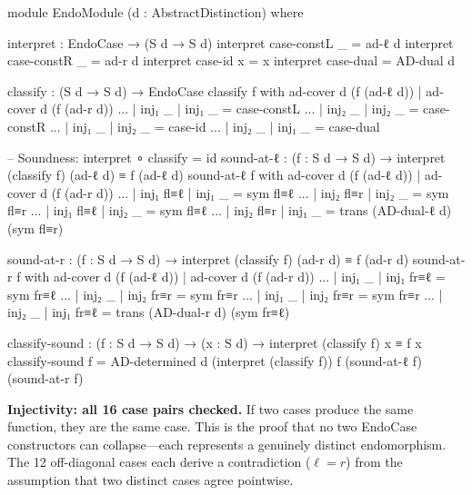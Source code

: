 \documentclass[11pt,a4paper]{article}
\begin{document}
\begin{code}
module EndoModule (d : AbstractDistinction) where

  interpret : EndoCase → (S d → S d)
  interpret case-constL _ = ad-ℓ d
  interpret case-constR _ = ad-r d
  interpret case-id     x = x
  interpret case-dual     = AD-dual d

  classify : (S d → S d) → EndoCase
  classify f with ad-cover d (f (ad-ℓ d)) | ad-cover d (f (ad-r d))
  ... | inj₁ _ | inj₁ _ = case-constL
  ... | inj₂ _ | inj₂ _ = case-constR
  ... | inj₁ _ | inj₂ _ = case-id
  ... | inj₂ _ | inj₁ _ = case-dual

  -- Soundness: interpret ∘ classify = id
  sound-at-ℓ : (f : S d → S d) →
               interpret (classify f) (ad-ℓ d) ≡ f (ad-ℓ d)
  sound-at-ℓ f with ad-cover d (f (ad-ℓ d)) | ad-cover d (f (ad-r d))
  ... | inj₁ fl≡ℓ | inj₁ _     = sym fl≡ℓ
  ... | inj₂ fl≡r | inj₂ _     = sym fl≡r
  ... | inj₁ fl≡ℓ | inj₂ _     = sym fl≡ℓ
  ... | inj₂ fl≡r | inj₁ _     = trans (AD-dual-ℓ d) (sym fl≡r)

  sound-at-r : (f : S d → S d) →
               interpret (classify f) (ad-r d) ≡ f (ad-r d)
  sound-at-r f with ad-cover d (f (ad-ℓ d)) | ad-cover d (f (ad-r d))
  ... | inj₁ _     | inj₁ fr≡ℓ = sym fr≡ℓ
  ... | inj₂ _     | inj₂ fr≡r = sym fr≡r
  ... | inj₁ _     | inj₂ fr≡r = sym fr≡r
  ... | inj₂ _     | inj₁ fr≡ℓ = trans (AD-dual-r d) (sym fr≡ℓ)

  classify-sound : (f : S d → S d) →
                   (x : S d) → interpret (classify f) x ≡ f x
  classify-sound f = AD-determined d
    (interpret (classify f)) f (sound-at-ℓ f) (sound-at-r f)
\end{code}

\textbf{Injectivity: all 16 case pairs checked.}
If two cases produce the same function, they are the same case.
This is the proof that no two EndoCase constructors can collapse---each
represents a genuinely distinct endomorphism. The 12 off-diagonal
cases each derive a contradiction ($\ell = r$) from the assumption
that two distinct cases agree pointwise.
\end{document}
